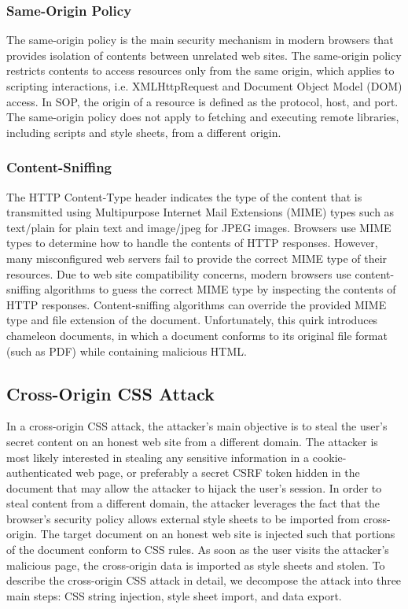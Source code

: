\documentclass{acm_proc_article-sp}
\begin{document}
\subsubsection{Same-Origin Policy}
The same-origin policy\cite{mozillasameorigin} is the main security mechanism in modern browsers that provides isolation of contents between unrelated web sites. The same-origin policy restricts contents to access resources only from the same origin, which applies to scripting interactions, i.e. XMLHttpRequest and Document Object Model (DOM)\cite{dom} access. In SOP, the origin of a resource is defined as the protocol, host, and port. The same-origin policy does not apply to fetching and executing remote libraries, including scripts and style sheets, from a different origin.

\subsubsection{Content-Sniffing}
The HTTP Content-Type header indicates the type of the content that is transmitted using Multipurpose Internet Mail Extensions (MIME)\cite{mime} types such as text/plain for plain text and image/jpeg for JPEG images. Browsers use MIME types to determine how to handle the contents of HTTP responses. However, many misconfigured web servers fail to provide the correct MIME type of their resources. Due to web site compatibility concerns, modern browsers use content-sniffing algorithms\cite{securecontentsniffing} to guess the correct MIME type by inspecting the contents of HTTP responses.  Content-sniffing algorithms can override the provided MIME type and file extension of the document. Unfortunately, this quirk introduces chameleon documents, in which a document conforms to its original file format (such as PDF) while containing malicious HTML.

\subsection{Cross-Origin CSS Attack}
In a cross-origin CSS attack, the attacker's main objective is to steal the user's secret content on an honest web site from a different domain. The attacker is most likely interested in stealing any sensitive information in a cookie-authenticated web page, or preferably a secret CSRF token\cite{csrf} hidden in the document that may allow the attacker to hijack the user's session. In order to steal content from a different domain, the attacker leverages the fact that the browser's security policy allows external style sheets to be imported from cross-origin. The target document on an honest web site is injected such that portions of the document conform to CSS rules. As soon as the user visits the attacker's malicious page, the cross-origin data is imported as style sheets and stolen. To describe the cross-origin CSS attack in detail, we decompose the attack into three main steps: CSS string injection, style sheet import, and data export.
\end{document}
